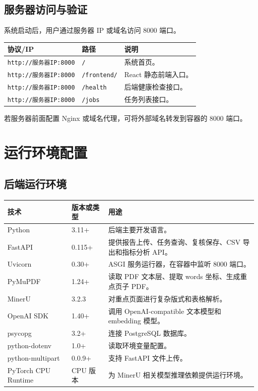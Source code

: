 \documentclass[UTF8,a4paper,12pt]{ctexart}
\newenvironment{manualtable}[1]{%
  \small
  \begin{longtable}{#1}
}{%
  \end{longtable}
  \normalsize
}
\begin{document}
\subsection{服务器访问与验证}

系统启动后，用户通过服务器 IP 或域名访问 8000 端口。

\begin{manualtable}{p{3.5cm}p{4cm}p{6.5cm}}
	\toprule
	\textbf{协议/IP} & \textbf{路径} & \textbf{说明} \\
	\midrule
	\endhead
	\texttt{http://服务器IP:8000} & \texttt{/} & 系统首页。 \\
	\texttt{http://服务器IP:8000} & \texttt{/frontend/} & React 静态前端入口。 \\
	\texttt{http://服务器IP:8000} & \texttt{/health} & 后端健康检查接口。 \\
	\texttt{http://服务器IP:8000} & \texttt{/jobs} & 任务列表接口。 \\
	\bottomrule
\end{manualtable}

若服务器前面配置 Nginx 或域名代理，可将外部域名转发到容器的 8000 端口。

\section{运行环境配置}

\subsection{后端运行环境}

\begin{manualtable}{p{3.5cm}p{3cm}p{8cm}}
\toprule
\textbf{技术} & \textbf{版本或类型} & \textbf{用途} \\
\midrule
\endhead
Python & 3.11+ & 后端主要开发语言。 \\
FastAPI & 0.115+ & 提供报告上传、任务查询、复核保存、CSV 导出和指标分析 API。 \\
Uvicorn & 0.30+ & ASGI 服务运行器，在容器中监听 8000 端口。 \\
PyMuPDF & 1.24+ & 读取 PDF 文本层、提取 words 坐标、生成重点页子 PDF。 \\
MinerU & 3.2.3 & 对重点页面进行复杂版式和表格解析。 \\
OpenAI SDK & 1.40+ & 调用 OpenAI-compatible 文本模型和 embedding 模型。 \\
psycopg & 3.2+ & 连接 PostgreSQL 数据库。 \\
python-dotenv & 1.0+ & 读取环境变量配置。 \\
python-multipart & 0.0.9+ & 支持 FastAPI 文件上传。 \\
PyTorch CPU Runtime & CPU 版本 & 为 MinerU 相关模型推理依赖提供运行环境。 \\
\bottomrule
\end{manualtable}
\end{document}
